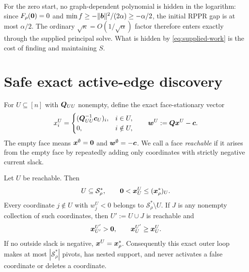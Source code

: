 For the zero start, no graph-dependent polynomial is hidden in the logarithm:
since $F_\rho(\bm{0})=0$ and
$\min f\geq-\lVert\bm{b}\rVert^2/(2\alpha)\geq-\alpha/2$, the initial RPPR gap is at
most $\alpha/2$.  The ordinary $\sqrt\kappa=O(1/\sqrt\alpha)$ factor therefore
enters exactly through the supplied principal solve.  What is hidden by
\cref{eq:supplied-work} is the cost of finding and maintaining $S$.

\section{Safe exact active-edge discovery}
\label{sec:safe-discovery}

For $U\subseteq[n]$ with $\bm{Q}_{UU}$ nonempty, define the exact face-stationary
vector
\begin{equation}
 x_i^U=
 \begin{cases}
  (\bm{Q}_{UU}^{-1}\bm{c}_U)_i,&i\in U,\\
  0,&i\notin U,
 \end{cases}
 \qquad
 \bm{w}^U:=\bm{Q}\bm{x}^U-\bm{c}.
 \label{eq:face-vector}
\end{equation}
The empty face means $\bm{x}^\emptyset=\bm{0}$ and $\bm{w}^\emptyset=-\bm{c}$.
We call a face \emph{reachable} if it arises from the empty face by repeatedly
adding only coordinates with strictly negative current slack.

\begin{theorem}
\label{thm:safe-pivots}
Let $U$ be reachable.  Then
\begin{equation}
 U\subseteq\mathcal S_\rho^*,
 \qquad
 \bm{0}<\bm{x}^U_U\leq(\bm{x}_\rho^*)_U.
 \label{eq:reachable-invariant}
\end{equation}
Every coordinate $j\notin U$ with $w_j^U<0$ belongs to
$\mathcal S_\rho^*\setminus U$.  If $J$ is any nonempty collection of such coordinates,
then $U':=U\cup J$ is reachable and
\begin{equation}
 \bm{x}^{U'}_{U'}>\bm{0},
 \qquad
 \bm{x}^{U'}_U\geq\bm{x}^U_U.
 \label{eq:batch-monotonicity}
\end{equation}
If no outside slack is negative, $\bm{x}^U=\bm{x}_\rho^*$.  Consequently this exact
outer loop makes at most $|\mathcal S_\rho^*|$ pivots, has nested support, and never
activates a false coordinate or deletes a coordinate.
\end{theorem}

